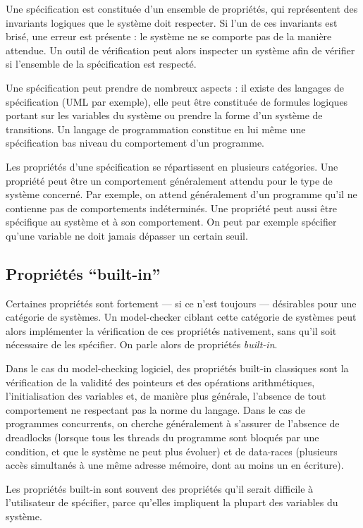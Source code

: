 Une spécification est constituée d'un ensemble de propriétés, qui représentent
des invariants logiques que le système doit respecter. Si l'un de ces invariants
est brisé, une erreur est présente : le système ne se comporte pas de la manière
attendue. Un outil de vérification peut alors inspecter un système afin de
vérifier si l'ensemble de la spécification est respecté.

Une spécification peut prendre de nombreux aspects : il existe des langages de
spécification (UML par exemple), elle peut être constituée de formules logiques
portant sur les variables du système ou prendre la forme d'un système de
transitions. Un langage de programmation constitue en lui même une spécification
bas niveau du comportement d'un programme.

Les propriétés d'une spécification se répartissent en plusieurs catégories. Une
propriété peut être un comportement généralement attendu pour le type de système
concerné. Par exemple, on attend généralement d'un programme qu'il ne contienne
pas de comportements indéterminés. Une propriété peut aussi être spécifique au
système et à son comportement. On peut par exemple spécifier qu'une variable ne
doit jamais dépasser un certain seuil.

\subsection{\texorpdfstring{Propriétés ``built-in''}{Propriétés built-in}}

Certaines propriétés sont fortement --- si ce n'est toujours --- désirables
pour une catégorie de systèmes. Un model-checker ciblant cette catégorie
de systèmes peut alors implémenter la vérification de ces propriétés
nativement, sans qu'il soit nécessaire de les spécifier. On parle alors
de propriétés \emph{built-in}.

Dans le cas du model-checking logiciel, des propriétés built-in
classiques sont la vérification de la validité des pointeurs et des
opérations arithmétiques, l'initialisation des variables et, de manière
plus générale, l'absence de tout comportement ne respectant pas la norme
du langage.
Dans le cas de programmes concurrents, on cherche généralement à s'assurer de
l'absence de dreadlocks (lorsque tous les threads du programme sont bloqués par une
condition, et que le système ne peut plus évoluer) et de data-races (plusieurs
accès simultanés à une même adresse mémoire, dont au moins un en écriture).

Les propriétés built-in sont souvent des propriétés qu'il serait difficile à
l'utilisateur de spécifier, parce qu'elles impliquent la plupart des variables
du système.

